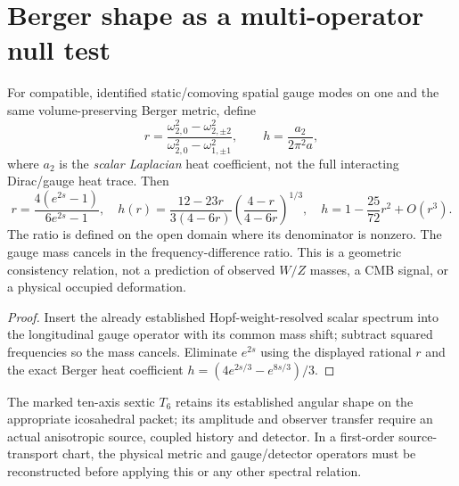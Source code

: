 \documentclass[12pt,a4paper]{article}
\begin{document}
\section{Berger shape as a multi-operator null test}
\label{bh:berger:v117:p6b:readout}
\begin{proposition}
\label{bh:berger:v117:p6b:heat-gauge}
For compatible, identified static/comoving spatial gauge modes on
one and the same volume-preserving Berger metric, define
\[
 r=\frac{\omega_{2,0}^2-\omega_{2,\pm2}^2}
         {\omega_{2,0}^2-\omega_{1,\pm1}^2},
 \qquad h=\frac{a_2}{2\pi^2a},
\]
where $a_2$ is the \emph{scalar Laplacian} heat coefficient,
not the full interacting Dirac/gauge heat trace. Then
\[
 r=\frac{4(e^{2s}-1)}{6e^{2s}-1},\quad
 h(r)=\frac{12-23r}{3(4-6r)}
              \left(\frac{4-r}{4-6r}\right)^{1/3},\quad
 h=1-\frac{25}{72}r^2+O(r^3).
\]
The ratio is defined on the open domain where its denominator is nonzero.
The gauge mass cancels in the frequency-difference ratio. This is a
geometric consistency relation, not a prediction of observed $W/Z$
masses, a CMB signal, or a physical occupied deformation.
\end{proposition}
\begin{proof}
Insert the already established Hopf-weight-resolved scalar
spectrum into the longitudinal gauge operator with its common
mass shift; subtract squared frequencies so the mass cancels.
Eliminate $e^{2s}$ using the displayed rational $r$ and the exact
Berger heat coefficient
$h=(4e^{2s/3}-e^{8s/3})/3$.
\end{proof}
\begin{remark}
\label{bh:berger:v117:p6b:t6}
The marked ten-axis sextic $T_6$ retains its established angular
shape on the appropriate icosahedral packet; its amplitude and
observer transfer require an actual anisotropic source, coupled
history and detector. In a first-order source-transport chart, the
physical metric and gauge/detector operators must be reconstructed
before applying this or any other spectral relation.
\end{remark}
\end{document}
